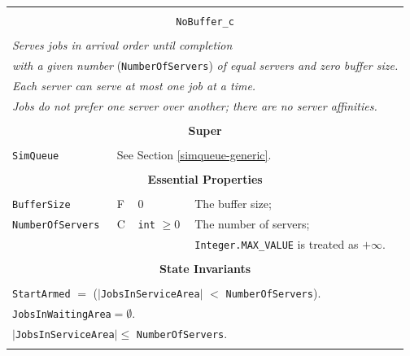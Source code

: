 \documentclass[12pt]{book}
\begin{document}
\begin{tabular}{|l|l|l|l|}
\hline
\multicolumn{4}{|c|}{} \\
\multicolumn{4}{|c|}{\lstinline[basicstyle=\large]{NoBuffer_c}} \\
\multicolumn{4}{|c|}{} \\
\hline
\multicolumn{4}{|l|}{\em Serves jobs in arrival order until completion\/} \\
\multicolumn{4}{|l|}{{\em with a given number\/} (\lstinline|NumberOfServers|)
                     {\em of equal servers and zero buffer size.}} \\
\multicolumn{4}{|l|}{\em Each server can serve at most one job at a time.} \\
\multicolumn{4}{|l|}{\em Jobs do not prefer one server over another; there are no server affinities.} \\
\hline
\multicolumn{4}{|c|}{} \\
\multicolumn{4}{|c|}{\bf Super} \\
\multicolumn{4}{|c|}{} \\
\hline
\lstinline|SimQueue| & \multicolumn{3}{|l|}{See Section \ref{simqueue-generic}.} \\
\hline
\multicolumn{4}{|c|}{} \\
\multicolumn{4}{|c|}{\bf Essential Properties} \\
\multicolumn{4}{|c|}{} \\
\hline
\lstinline|BufferSize|      & F & $0$
                            & The buffer size; \\
\hline
\lstinline|NumberOfServers| & C & \lstinline|int| $\geq 0$
                            & The number of servers; \\
                        & & & \lstinline|Integer.MAX_VALUE| is treated as $+\infty$. \\
\hline
\multicolumn{4}{|c|}{} \\
\multicolumn{4}{|c|}{\bf State  Invariants} \\
\multicolumn{4}{|c|}{} \\
\hline
\multicolumn{4}{|l|}{\lstinline|StartArmed| $=$ ($|$\lstinline|JobsInServiceArea|$|$ $<$ \lstinline|NumberOfServers|).} \\
\multicolumn{4}{|l|}{\lstinline|JobsInWaitingArea|$ = \emptyset$.} \\
\multicolumn{4}{|l|}{$|$\lstinline|JobsInServiceArea|$| \leq$ \lstinline|NumberOfServers|.} \\
\hline
\multicolumn{4}{|c|}{} \\

\end{tabular}
\end{document}
